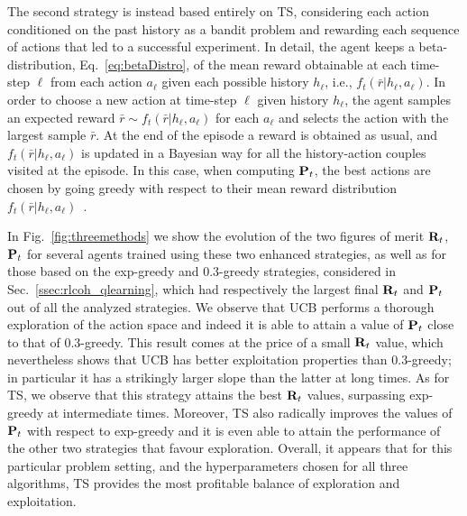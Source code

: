 The second strategy is instead based entirely on TS, considering each action conditioned on the past history as a bandit problem and rewarding each sequence of actions that led to a successful experiment. In detail, the agent keeps a beta-distribution, Eq.~\eqref{eq:betaDistro}, of the mean reward obtainable at each time-step $\ell$ from each action $a_{\ell}$ given each possible history $h_{\ell}$, i.e., $f_{t}(\bar{r}|h_{\ell},a_{\ell})$. In order to choose a new action at time-step $\ell$ given history $h_{\ell}$, the agent samples an expected reward $\bar{r} \sim f_{t}(\bar{r}|h_{\ell},a_{\ell})$ for each $a_{\ell}$
and selects the action with the largest sample $\bar{r}$.
At the end of the episode a reward is obtained as usual, and $f_{t}(\bar{r}|h_{\ell},a_{\ell})$ is updated in a Bayesian way for all the history-action couples visited at the episode. In this case, when computing $\mathbf{P}_{t}$, the best actions are chosen by going greedy with respect to their mean reward distribution $f_{t}(\bar{r}|h_{\ell},a_{\ell})$~\cite{Russo2018}.

In Fig.~\ref{fig:threemethods} we show the evolution of the two figures of merit $\mathbf{R}_{t}$, $\mathbf{P}_{t}$ for several agents trained using these two enhanced strategies, as well as for those based on the exp-greedy and $0.3$-greedy strategies, considered in Sec.~\ref{ssec:rlcoh_qlearning}, which had respectively the largest final $\mathbf{R}_{t}$ and $\mathbf{P}_{t}$ out of all the analyzed strategies.
We observe that UCB performs a thorough exploration of the action space and indeed it is able to attain a value of $\mathbf{P}_{t}$ close to that of $0.3$-greedy. This result comes at the price of a small $\mathbf{R}_{t}$ value, which nevertheless shows that UCB has better exploitation properties than $0.3$-greedy; in particular it has a strikingly larger slope than the latter at long times. As for TS, we observe that this strategy attains the best $\mathbf{R}_{t}$ values, surpassing exp-greedy at intermediate times. Moreover, TS also radically improves the values of $\mathbf{P}_{t}$ with respect to exp-greedy and it is even able to attain the performance of the other two strategies that favour exploration. Overall, it appears that for this particular problem setting, and the hyperparameters chosen for all three algorithms, TS provides the most profitable balance of exploration and exploitation.

